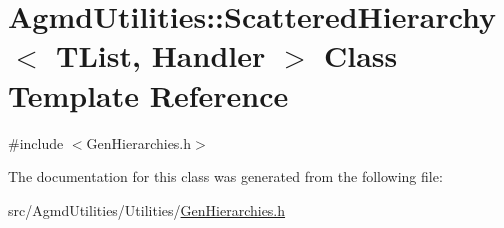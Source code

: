 \hypertarget{class_agmd_utilities_1_1_scattered_hierarchy}{\section{Agmd\+Utilities\+:\+:Scattered\+Hierarchy$<$ T\+List, Handler $>$ Class Template Reference}
\label{class_agmd_utilities_1_1_scattered_hierarchy}
}


{\ttfamily \#include $<$Gen\+Hierarchies.\+h$>$}



The documentation for this class was generated from the following file\+:\begin{DoxyCompactItemize}
\item 
src/\+Agmd\+Utilities/\+Utilities/\hyperlink{_gen_hierarchies_8h}{Gen\+Hierarchies.\+h}\end{DoxyCompactItemize}
